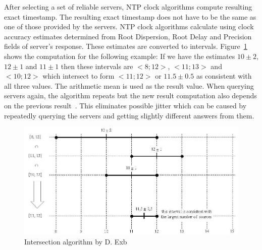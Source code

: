 After selecting a set of reliable servers, NTP clock algorithms compute resulting exact timestamp.
The resulting exact timestamp does not have to be the same
as one of those provided by the servers.
NTP clock algorithms calculate using clock accuracy estimates
determined from Root Dispersion, Root Delay and Precision fields of server's response.
These estimates are converted to intervals.
Figure~\ref{fig:ntp-intersection} shows the computation for the following example:
If we have the estimates $10 \pm 2$, $12 \pm 1$ and $11 \pm 1$
then these intervals are $<8; 12>$, $<11; 13>$ and $<10; 12>$ which
intersect to form $<11; 12>$ or $11.5 \pm 0.5$ as consistent with all three values.
The arithmetic mean is used as the result value.
When querying servers again, the algorithm repeats but the new result computation
also depends on the previous result~\cite{rfc5905,ntp-history}.
This eliminates possible jitter which can be caused by repeatedly querying the servers
and getting slightly different answers from them.

\begin{figure}
	\centering
	\includegraphics[width=13cm,keepaspectratio]{fig/Marzullo_example-1.jpg}
	\caption{Intersection algorithm by D. Exb}
	\label{fig:ntp-intersection}
	\bigskip
\end{figure}

